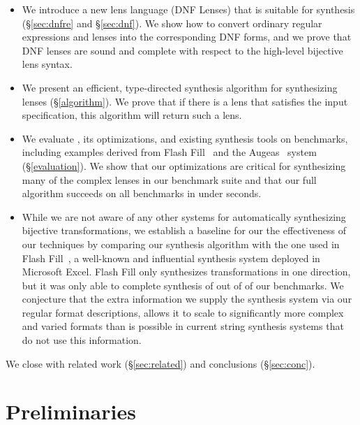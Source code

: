 \documentclass[sigplan,acmsmall]{acmart}
\begin{document}
\begin{itemize}
\item 
  We introduce a new lens language (DNF Lenses) that is suitable for synthesis
  (\S\ref{sec:dnfre} and \S\ref{sec:dnf}).  
  We show how to convert ordinary regular expressions and lenses
  into the corresponding DNF forms, and we prove that DNF lenses are sound
  and complete with respect to the high-level bijective lens syntax.

\item
  We present an efficient, type-directed synthesis algorithm for
  synthesizing lenses (\S\ref{algorithm}).  We prove that if there is a lens
  that satisfies the input specification, this algorithm will return such a lens.

\item
  We evaluate \Optician{}, its optimizations, and
  existing synthesis tools on \BenchmarkCount benchmarks, including
  examples derived from Flash Fill~\cite{gulwani-popl-2014} and the
  Augeas~\cite{augeas} system (\S \ref{evaluation}).  
  We show that our optimizations are critical for synthesizing many of
  the complex lenses in our benchmark suite and that our full
  algorithm succeeds on all benchmarks in under \SynthesizedUnder
  seconds.  

\item While we are not aware of any other systems for automatically
 synthesizing bijective transformations, we establish a baseline for
 our the effectiveness of our techniques by comparing our synthesis algorithm
 with the one used in Flash Fill~\cite{gulwani-popl-2014}, a well-known
 and influential synthesis system deployed in Microsoft Excel.  Flash Fill only
 synthesizes transformations in one direction, but it was only able to
 complete synthesis of \FlashFillSuccesses{} out of \BenchmarkCount of our benchmarks.  We conjecture
 that the extra information we supply the synthesis system via our 
 regular format descriptions, allows it to scale to significantly more
 complex and varied formats than is possible in 
 current string synthesis systems that do not use this information.
\end{itemize} We close with related work
(\S \ref{sec:related}) and conclusions (\S \ref{sec:conc}).


\section{Preliminaries}
\label{preliminaries}
\end{document}
